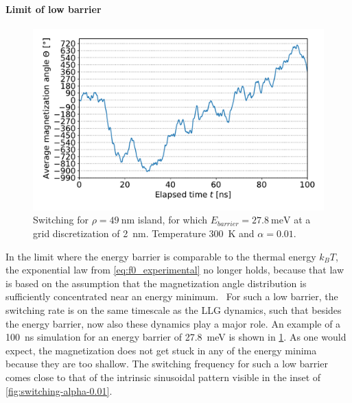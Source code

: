 \documentclass[11pt,a4paper,english]{article}
\begin{document}
\paragraph{Limit of low barrier}
\begin{figure}
    \centering
    \includegraphics[width=0.8\columnwidth]{Figures/biaxial_island/Switching/49x100_300K_alpha0.01_100ns_2nm.pdf}
    \caption{Switching for $\rho=\SI{49}{\nano\metre}$ island, for which $E_{barrier}=\SI{27.8}{\milli\electronvolt}$ at a grid discretization of \SI{2}{\nano\metre}. Temperature \SI{300}{\kelvin} and $\alpha = 0.01$.}
    \label{fig:switching-49x100-300}
\end{figure}
In the limit where the energy barrier is comparable to the thermal energy $k_B T$, the exponential law from \cref{eq:f0_experimental} no longer holds, because that law is based on the assumption that the magnetization angle distribution is sufficiently concentrated near an energy minimum.~\cite{ThermFluc_SingleDomain}
For such a low barrier, the switching rate is on the same timescale as the LLG dynamics, such that besides the energy barrier, now also these dynamics play a major role. An example of a \SI{100}{\nano\second} simulation for an energy barrier of \SI{27.8}{\milli\electronvolt} is shown in \cref{fig:switching-49x100-300}. As one would expect, the magnetization does not get stuck in any of the energy minima because they are too shallow. The switching frequency for such a low barrier comes close to that of the intrinsic sinusoidal pattern visible in the inset of \cref{fig:switching-alpha-0.01}.


\clearpage
\end{document}
